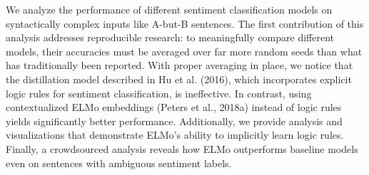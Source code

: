 We analyze the performance of different sentiment classification models on syntactically complex inputs like A-but-B sentences. The first contribution of this analysis addresses reproducible research: to meaningfully compare different models, their accuracies must be averaged over far more random seeds than what has traditionally been reported. With proper averaging in place, we notice that the distillation model described in Hu et al. (2016), which incorporates explicit logic rules for sentiment classification, is ineffective. In contrast, using contextualized ELMo embeddings (Peters et al., 2018a) instead of logic rules yields significantly better performance. Additionally, we provide analysis and visualizations that demonstrate ELMo's ability to implicitly learn logic rules. Finally, a crowdsourced analysis reveals how ELMo outperforms baseline models even on sentences with ambiguous sentiment labels.
